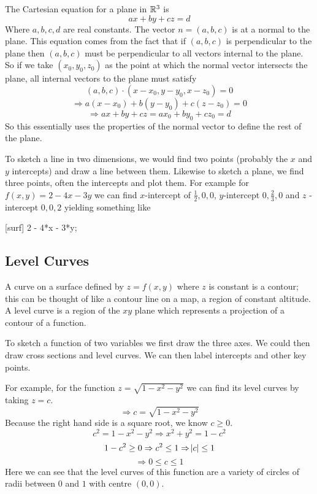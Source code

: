 \documentclass[12pt]{report}
\begin{document}
\begin{flushleft}
The Cartesian equation for a plane in \(\mathbb{R}^3\) is
\[ax + by + cz = d\]
Where \(a, b, c, d\) are real constants. The vector \(n = (a, b, c)\) is at
a normal to the plane. This equation comes from the fact that if \((a, b, c)\)
is perpendicular to the plane then \((a, b, c)\) must be perpendicular to all
vectors internal to the plane. So if we take \((x_0, y_0, z_0)\) as the point
at which the normal vector intersects the plane, all internal vectors to the
plane must satisfy
\[(a, b, c)\cdot(x - x_0, y - y_0, x - z_0) = 0\]
\[\Rightarrow a(x - x_0) + b(y - y_0) + c(z - z_0) = 0\]
\[\Rightarrow ax + by + cz = ax_0 + by_0 + cz_0 = d\]
So this essentially uses the properties of the normal vector to define the
rest of the plane. \par
To sketch a line in two dimensions, we would find two points (probably the
\(x\) and \(y\) intercepts) and draw a line between them. Likewise to sketch
a plane, we find three points, often the intercepts and plot them. For
example for \(f(x, y) = 2 - 4x - 3y\) we can find \(x\)-intercept of
\(\frac{1}{2}, 0, 0\), \(y\)-intercept \(0, \frac{2}{3}, 0\) and \(z\)
-intercept \(0, 0, 2\) yielding something like

\begin{plot3}[
    xmin = 0,
    xmax = 10,
    ymin = 0,
    ymax = 10,
    zmin = 0,
    zmax = 10,
    view = {115}{80},
    samples = 50
]
    [surf] {2 - 4*x - 3*y};
\end{plot3}

\subsection*{Level Curves}

A curve on a surface defined by \(z = f(x, y)\) where \(z\) is constant is a
contour; this can be thought of like a contour line on a map, a region of
constant altitude. A level curve is a region of the \(xy\) plane which
represents a projection of a contour of a function. \par
To sketch a function of two variables we first draw the three axes. We could
then draw cross sections and level curves. We can then label intercepts and
other key points. \par
For example, for the function \(z = \sqrt{1 - x^2 - y^2}\) we can find its
level curves by taking \(z = c\).
\[\Rightarrow c = \sqrt{1 - x^2 - y^2}\]
Because the right hand side is a square root, we know \(c \geq 0\).
\[c^2 = 1 - x^2 - y^2 \Rightarrow x^2 + y^2 = 1 - c^2\]
\[1 - c^2 \geq 0 \Rightarrow c^2 \leq 1 \Rightarrow \abs{c} \leq 1\]
\[\Rightarrow 0 \leq c \leq 1\]
Here we can see that the level curves of this function are a variety of circles
of radii between \(0\) and \(1\) with centre \((0, 0)\).


\end{flushleft}
\end{document}
